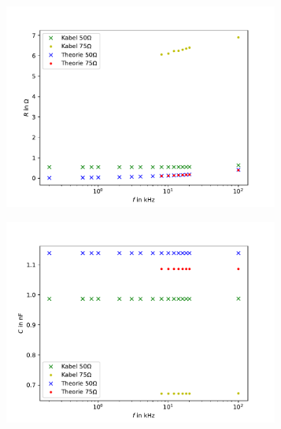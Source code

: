 \begin{figure}[h]
	\centering
	\begin{subfigure}{0.495\textwidth}
		\centering
		\includegraphics[width=0.99\textwidth]{RLC_DirekteMessung/build/PlotR.pdf}
		\label{fig:PlotR}
	\end{subfigure}
	\begin{subfigure}{0.495\textwidth}
		\centering
		\includegraphics[width=0.99\textwidth]{RLC_DirekteMessung/build/PlotC.pdf}
		\label{fig:PlotC}
	\end{subfigure}
	\begin{subfigure}{0.495\textwidth}
		\centering

\end{subfigure}
\end{figure}
